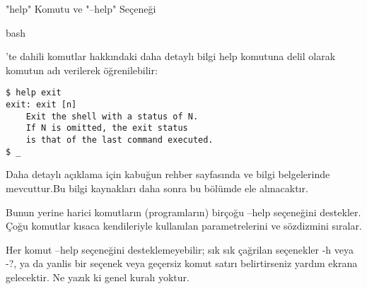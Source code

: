 \documentclass[10pt,a5paper]{book}
\begin{document}
\begin{section}{"help" Komutu ve "--help" Seçeneği}

\begin{em}bash\end{em}'te dahili komutlar hakkındaki daha detaylı bilgi help komutuna delil olarak komutun adı verilerek öğrenilebilir:
\begin{verbatim}
$ help exit
exit: exit [n]
    Exit the shell with a status of N.
    If N is omitted, the exit status
    is that of the last command executed.
$ _
\end{verbatim}

Daha detaylı açıklama için kabuğun rehber sayfasında ve bilgi belgelerinde mevcuttur.Bu bilgi kaynakları daha sonra bu bölümde ele alınacaktır.

Bunun yerine harici komutların (programların) birçoğu --help seçeneğini destekler. Çoğu komutlar kısaca kendileriyle kullanılan parametrelerini ve sözdizmini sıralar.

Her komut --help seçeneğini desteklemeyebilir; sık sık çağrilan seçenekler -h veya -?, ya da yanlis bir seçenek veya geçersiz komut satırı belirtirseniz yardım ekrana gelecektir. Ne yazık ki genel kuralı yoktur.
\end{section}
\end{document}

